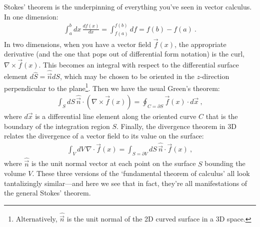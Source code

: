 \documentclass[
  11pt,
	colorful,
	raggedright,
]{tufte-style-thesis-flip}
\begin{document}
Stokes' theorem is the underpinning of everything you've seen in vector calculus. In one dimension:
\begin{align}
  \int_a^b dx\, \frac{df(x)}{dx} = \int_{f(a)}^{f(b)} df = f(b)-f(a) \ .
\end{align}
In two dimensions, when you have a vector field $\vec{f}(x)$, the appropriate derivative (and the one that pops out of differential form notation) is the curl, $\nabla\times \vec{f}(x)$. This becomes an integral with respect to the differential surface element $d\hat{S} = \hat{\vec{n}} dS$, which may be chosen to be oriented in the $z$-direction perpendicular to the plane\footnote{Alternatively, $\hat{\vec{n}}$ is the unit normal of the 2D curved surface in a 3D space.}. Then we have the usual  Green's theorem:
\begin{align}
  \int_S dS\, \hat{\vec{n}}\cdot \left(\nabla\times \vec{f}(x)\right) 
  =
  \oint_{C=\partial S} \vec{f}(x)\cdot d\vec{x} 
  \ ,
\end{align}
where $d\vec{x}$ is a differential line element along the oriented curve $C$ that is the boundary of the integration region $S$. Finally, the divergence theorem in 3D relates the divergence of a vector field to its value on the surface:
\begin{align}
  \int_V dV \, \nabla\cdot \vec{f}(x)
  =
  \int_{S=\partial V} dS \, \hat{\vec{n}} \cdot \vec{f}(x) \ ,
\end{align}
where $\hat{\vec{n}}$ is the unit normal vector at each point on the surface $S$ bounding the volume $V$. These three versions of the `fundamental theorem of calculus' all look tantalizingly similar---and here we see that in fact, they're all manifestations of the general Stokes' theorem. 
\end{document}
